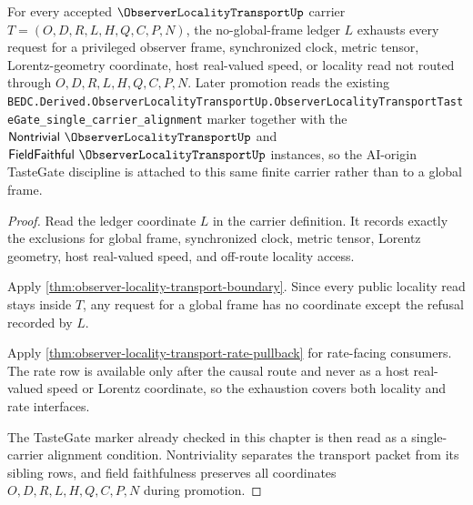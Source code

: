 \begin{theorem}
\label{thm:observer-locality-transport-obligation-nonglobal-frame-exhaustion}
For every accepted $\ObserverLocalityTransportUp$ carrier $T=(O,D,R,L,H,Q,C,P,N)$, the no-global-frame ledger $L$ exhausts every request for a privileged observer frame, synchronized clock, metric tensor, Lorentz-geometry coordinate, host real-valued speed, or locality read not routed through $O,D,R,L,H,Q,C,P,N$. Later promotion reads the existing \texttt{BEDC.Derived.ObserverLocalityTransportUp.ObserverLocalityTransportTasteGate\_single\_carrier\_alignment} marker together with the $\mathsf{Nontrivial}\ \ObserverLocalityTransportUp$ and $\mathsf{FieldFaithful}\ \ObserverLocalityTransportUp$ instances, so the AI-origin TasteGate discipline is attached to this same finite carrier rather than to a global frame.
\end{theorem}
\begin{proof}
Read the ledger coordinate $L$ in the carrier definition. It records exactly the exclusions for global frame, synchronized clock, metric tensor, Lorentz geometry, host real-valued speed, and off-route locality access.

Apply \autoref{thm:observer-locality-transport-boundary}. Since every public locality read stays inside $T$, any request for a global frame has no coordinate except the refusal recorded by $L$.

Apply \autoref{thm:observer-locality-transport-rate-pullback} for rate-facing consumers. The rate row is available only after the causal route and never as a host real-valued speed or Lorentz coordinate, so the exhaustion covers both locality and rate interfaces.

The TasteGate marker already checked in this chapter is then read as a single-carrier alignment condition. Nontriviality separates the transport packet from its sibling rows, and field faithfulness preserves all coordinates $O,D,R,L,H,Q,C,P,N$ during promotion.
\end{proof}

